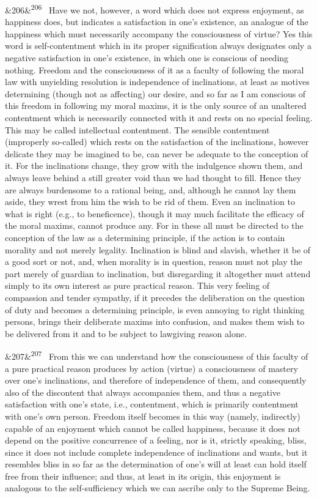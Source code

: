 \documentclass[12pt]{article}
\newcommand{\para}[1][]{\par\noindent\ifx&#1&\else\textsuperscript{\footnotesize #1}~\fi}
\begin{document}
\para[206] Have we not, however, a word which does not express enjoyment, as happiness does, but indicates a satisfaction in one's existence, an analogue of the happiness which must necessarily accompany the consciousness of virtue? Yes this word is self-contentment which in its proper signification always designates only a negative satisfaction in one's existence, in which one is conscious of needing nothing. Freedom and the consciousness of it as a faculty of following the moral law with unyielding resolution is independence of inclinations, at least as motives determining (though not as affecting) our desire, and so far as I am conscious of this freedom in following my moral maxims, it is the only source of an unaltered contentment which is necessarily connected with it and rests on no special feeling. This may be called intellectual contentment. The sensible contentment (improperly so-called) which rests on the satisfaction of the inclinations, however delicate they may be imagined to be, can never be adequate to the conception of it. For the inclinations change, they grow with the indulgence shown them, and always leave behind a still greater void than we had thought to fill. Hence they are always burdensome to a rational being, and, although he cannot lay them aside, they wrest from him the wish to be rid of them. Even an inclination to what is right (e.g., to beneficence), though it may much facilitate the efficacy of the moral maxims, cannot produce any. For in these all must be directed to the conception of the law as a determining principle, if the action is to contain morality and not merely legality. Inclination is blind and slavish, whether it be of a good sort or not, and, when morality is in question, reason must not play the part merely of guardian to inclination, but disregarding it altogether must attend simply to its own interest as pure practical reason. This very feeling of compassion and tender sympathy, if it precedes the deliberation on the question of duty and becomes a determining principle, is even annoying to right thinking persons, brings their deliberate maxims into confusion, and makes them wish to be delivered from it and to be subject to lawgiving reason alone.

\para[207] From this we can understand how the consciousness of this faculty of a pure practical reason produces by action (virtue) a consciousness of mastery over one's inclinations, and therefore of independence of them, and consequently also of the discontent that always accompanies them, and thus a negative satisfaction with one's state, i.e., contentment, which is primarily contentment with one's own person. Freedom itself becomes in this way (namely, indirectly) capable of an enjoyment which cannot be called happiness, because it does not depend on the positive concurrence of a feeling, nor is it, strictly speaking, bliss, since it does not include complete independence of inclinations and wants, but it resembles bliss in so far as the determination of one's will at least can hold itself free from their influence; and thus, at least in its origin, this enjoyment is analogous to the self-sufficiency which we can ascribe only to the Supreme Being.
\end{document}
